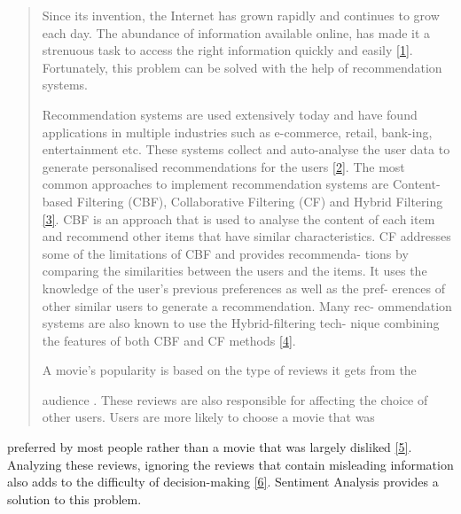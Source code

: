 \documentclass[
]{article}
\begin{document}
\begin{quote}
Since its invention, the Internet has grown rapidly and continues to
grow each day. The abundance of information available online, has made
it a strenuous task to access the right information quickly and easily
\protect\hyperlink{_bookmark21}{{[}1{]}}. Fortunately, this problem can
be solved with the help of recommendation systems.

Recommendation systems are used extensively today and have found
applications in multiple industries such as e-commerce, retail,
bank-ing, entertainment etc. These systems collect and auto-analyse the
user data to generate personalised recommendations for the users
\protect\hyperlink{_bookmark22}{{[}2{]}}. The most common approaches to
implement recommendation systems are Content-based Filtering (CBF),
Collaborative Filtering (CF) and Hybrid Filtering
\protect\hyperlink{_bookmark23}{{[}3{]}}. CBF is an approach that is
used to analyse the content of each item and recommend other items that
have similar characteristics. CF addresses some of the limitations of
CBF and provides recommenda- tions by comparing the similarities between
the users and the items. It uses the knowledge of the user's previous
preferences as well as the pref- erences of other similar users to
generate a recommendation. Many rec- ommendation systems are also known
to use the Hybrid-ﬁltering tech- nique combining the features of both
CBF and CF methods \protect\hyperlink{_bookmark24}{{[}4{]}}.

A movie's popularity is based on the type of reviews it gets from the

audience . These reviews are also responsible for aﬀecting the choice of
other users. Users are more likely to choose a movie that was
\end{quote}

preferred by most people rather than a movie that was largely disliked
\protect\hyperlink{_bookmark25}{{[}5{]}}. Analyzing these reviews,
ignoring the reviews that contain misleading information also adds to
the diﬃculty of decision-making
\protect\hyperlink{_bookmark26}{{[}6{]}}. Sentiment Analysis provides a
solution to this problem.
\end{document}
